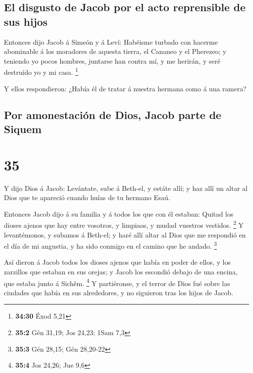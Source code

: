 \hypertarget{el-disgusto-de-jacob-por-el-acto-reprensible-de-sus-hijos}{%
\subsection{El disgusto de Jacob por el acto reprensible de sus
hijos}\label{el-disgusto-de-jacob-por-el-acto-reprensible-de-sus-hijos}}

 Entonces dijo Jacob á Simeón y á Leví: Habéisme turbado
con hacerme abominable á los moradores de aquesta tierra, el Cananeo y
el Pherezeo; y teniendo yo pocos hombres, juntarse han contra mí, y me
herirán, y seré destruído yo y mi casa. \footnote{\textbf{34:30} Éxod
  5,21}

 Y ellos respondieron: ¿Había él de tratar á nuestra
hermana como á una ramera?

\hypertarget{por-amonestaciuxf3n-de-dios-jacob-parte-de-siquem}{%
\subsection{Por amonestación de Dios, Jacob parte de
Siquem}\label{por-amonestaciuxf3n-de-dios-jacob-parte-de-siquem}}

\hypertarget{section-34}{%
\section{35}\label{section-34}}

 Y dijo Dios á Jacob: Levántate, sube á Beth-el, y estáte
allí; y haz allí un altar al Dios que te apareció cuando huías de tu
hermano Esaú.

 Entonces Jacob dijo á su familia y á todos los que con él
estaban: Quitad los dioses ajenos que hay entre vosotros, y limpiaos, y
mudad vuestros vestidos. \footnote{\textbf{35:2} Gén 31,19; Jos 24,23;
  1Sam 7,3}  Y levantémonos, y subamos á Beth-el; y haré
allí altar al Dios que me respondió en el día de mi angustia, y ha sido
conmigo en el camino que he andado. \footnote{\textbf{35:3} Gén 28,15;
  Gén 28,20-22}

 Así dieron á Jacob todos los dioses ajenos que había en
poder de ellos, y los zarzillos que estaban en sus orejas; y Jacob los
escondió debajo de una encina, que estaba junto á Sichêm. \footnote{\textbf{35:4}
  Jos 24,26; Jue 9,6}  Y partiéronse, y el terror de Dios
fué sobre las ciudades que había en sus alrededores, y no siguieron tras
los hijos de Jacob.


